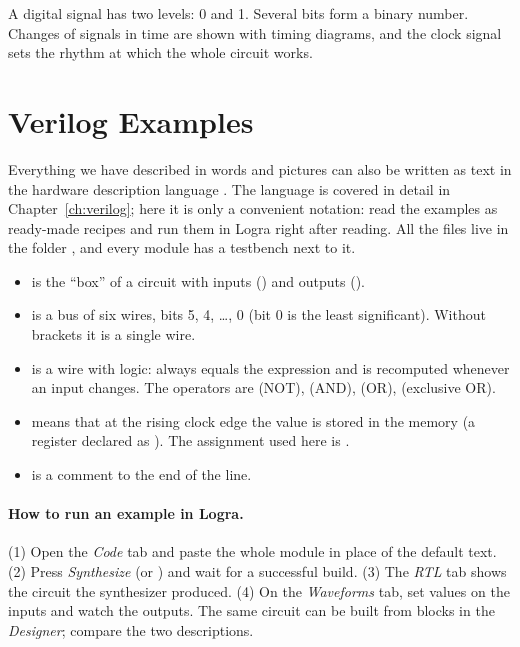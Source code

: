 \begin{ideabox}
A digital signal has two levels: 0 and 1. Several bits form a binary number.
Changes of signals in time are shown with timing diagrams, and the clock
signal sets the rhythm at which the whole circuit works.
\end{ideabox}

\section{Verilog Examples}
\label{sec:signals-verilog}

Everything we have described in words and pictures can also be written as text
in the hardware description language . The language is covered in
detail in Chapter~\ref{ch:verilog}; here it is only a convenient notation:
read the examples as ready-made recipes and run them in Logra right after
reading. All the files live in the folder , and every
module has a testbench  next to it.

\begin{infobox}
\begin{itemize}
  \item {} is the ``box'' of a circuit
    with inputs () and outputs ().
  \item \code{[5:0]} is a bus of six wires, bits 5, 4, \ldots, 0 (bit 0 is the
    least significant). Without brackets it is a single wire.
  \item {} is a wire with logic:  always
    equals the expression and is recomputed whenever an input changes. The
    operators are \code{\textasciitilde} (NOT), \code{\&} (AND), \code{|} (OR),
    \code{\^{}} (exclusive OR).
  \item {} means that at the rising clock edge
    the value  is stored in the memory  (a register declared as
    ). The assignment used here is \code{<=}.
  \item \code{//} is a comment to the end of the line.
\end{itemize}
\end{infobox}

\paragraph{How to run an example in Logra.} (1) Open the \emph{Code} tab and
paste the whole module in place of the default text. (2) Press
\emph{Synthesize} (or ) and wait for a successful build.
(3) The \emph{RTL} tab shows the circuit the synthesizer produced. (4) On the
\emph{Waveforms} tab, set values on the inputs and watch the outputs. The same
circuit can be built from blocks in the \emph{Designer}; compare the two
descriptions.

